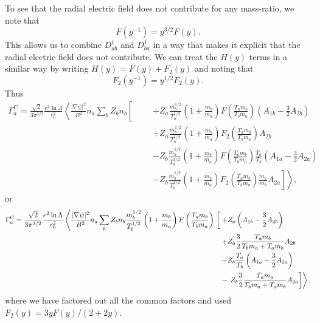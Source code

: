 \documentclass[12pt, a4paper]{article}
\newcommand{\lang}{\left\langle}
\newcommand{\rang}{\right\rangle}
\begin{document}
To see that the radial electric field does not contribute for any mass-ratio, we note that
\begin{equation}
F(y^{-1}) = y^{3/2} F(y).
\end{equation}
This allows us to combine $D^1_{ab}$ and $D^1_{ba}$ in a way that makes it explicit that the radial electric field does not contribute. We can treat the $H(y)$ terms in a similar way by writing $H(y) = F(y) + F_2(y)$ and noting that
\begin{equation}
F_2(y^{-1}) = y^{1/2} F_2(y).
\end{equation}
Thus
\begin{equation}
  \begin{aligned}
   \Gamma_a^{\text{C}} = \frac{\sqrt{2}}{3\pi^{3/2}} \frac{ e^2 \ln \Lambda}{\epsilon_0^2 } 
    \lang \frac{|\nabla \psi|^2}{B^2} n_a \sum_b Z_b n_b \right.\left[\phantom{\frac{m_b^{3/2}}{m_a}} \right.
      &+ Z_a  \frac{m_b^{1/2}}{T_b^{1/2}} \left(1 + \frac{m_b}{m_a} \right)  F\left(\frac{T_a m_b}{T_b m_a}\right) \left(A_{1b} - \frac{3}{2} A_{2b}\right) \\
      &+ Z_a  \frac{m_b^{1/2}}{T_b^{1/2}} \left(1 + \frac{m_b}{m_a}\right) F_2\left(\frac{T_a m_b}{T_b m_a}\right) A_{2b} \\
      &-Z_b\frac{m_b^{1/2}}{T_b^{1/2}}\left(1 + \frac{m_b}{m_a} \right) F\left(\frac{T_a m_b}{T_b m_a}\right) \frac{T_a}{T_b}\left(A_{1a} - \frac{3}{2} A_{2a}\right) \\ &\left.\left.
      - Z_b \frac{m_b^{1/2}}{T_b^{1/2}}  \left(1 + \frac{m_b}{m_a}\right) F_2\left(\frac{T_a m_b}{T_b m_a}\right) \frac{m_a}{m_b} A_{2a} \right] \rang,
\end{aligned}
\end{equation}
or
\begin{equation}
  \begin{aligned}
   \Gamma_a^{\text{C}} = \frac{\sqrt{2}}{3\pi^{3/2}} \frac{ e^2 \ln \Lambda}{\epsilon_0^2 } 
    \lang \frac{|\nabla \psi|^2}{B^2} n_a \sum_b Z_b n_b \frac{m_b^{1/2}}{T_b^{1/2}} \left(1 + \frac{m_b}{m_a} \right) F\left(\frac{T_a m_b}{T_b m_a}\right)\right.\left[\vphantom{\frac{T_am_b}{T_bm_a}} \right.
      + &Z_a     \left(A_{1b} - \frac{3}{2} A_{2b}\right) \\
      + &Z_a  \frac{3}{2} \frac{T_a m_b}{T_b m_a + T_a m_b} A_{2b} \\
      - &Z_b  \frac{T_a}{T_b}\left(A_{1a} - \frac{3}{2} A_{2a}\right) \\ 
      - &\left.\left.Z_b \frac{3}{2} \frac{T_a m_a}{T_b m_a + T_a m_b}  A_{2a} \right] \rang,
\end{aligned} \label{eq:fluxg}
\end{equation}
where we have factored out all the common factors and used $F_2(y) = 3y F(y)/(2+2y)$.
\end{document}
